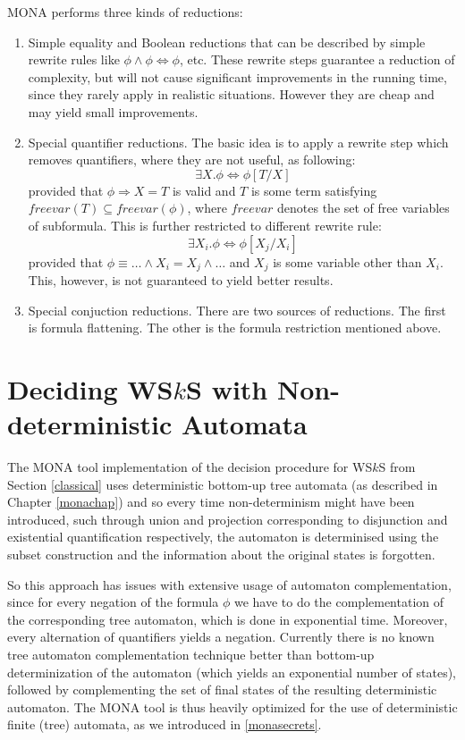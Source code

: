 MONA performs three kinds of reductions:
\begin{enumerate}
 \item Simple equality and Boolean reductions that can be described by simple
 rewrite rules like $\phi \wedge \phi \Leftrightarrow \phi$, etc. These rewrite
 steps guarantee a reduction of complexity, but will not cause significant
 improvements in the running time, since they rarely apply in realistic
 situations. However they are cheap and may yield small improvements.

\item Special quantifier reductions. The basic idea is to apply a rewrite step
which removes quantifiers, where they are not useful, as following: 
\begin{equation}\exists X
. \phi \Leftrightarrow \phi[T/X]\end{equation} provided that $\phi \Rightarrow
X = T$ is valid and $T$ is some term satisfying $freevar(T) \subseteq freevar(\phi)$,
where $freevar$ denotes the set of free variables of subformula. This is further
restricted to different rewrite rule: \begin{equation} \exists X_i . \phi \Leftrightarrow
\phi[X_j/X_i]\end{equation} provided that $\phi \equiv \ldots \wedge X_i = X_j \wedge
\ldots$ and $X_j$ is some variable other than $X_i$. This, however, is not
guaranteed to yield better results.

\item Special conjuction reductions. There are two sources of reductions. The
first is formula flattening. The other is  the formula restriction mentioned
above.
\end{enumerate}

 \chapter{Deciding WS$k$S with Non-deterministic Automata}\label{our}

The \textsc{MONA} tool implementation of the decision procedure for WS$k$S from
Section \ref{classical} uses deterministic bottom-up tree automata (as described
in Chapter \ref{monachap}) and so every time non-determinism might have been
introduced, such through union and projection corresponding to disjunction
and existential quantification respectively, the automaton is determinised using the
subset construction and the information about the original states is forgotten.

So this approach has issues with extensive usage of automaton complementation,
since for every negation of the formula $\phi$ we have to do the
complementation of the corresponding tree automaton, which is done in
exponential time. Moreover, every alternation of quantifiers yields a
negation. Currently there is no known tree automaton complementation technique
better than bottom-up determinization of the automaton (which yields
an exponential number of states), followed by complementing the set of final
states of the resulting deterministic automaton. The MONA tool is thus heavily
optimized for the use of deterministic finite (tree) automata, as we introduced in
\ref{monasecrets}.

